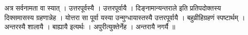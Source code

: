 अत्र सर्वनामता वा स्यात् । उत्तरपूर्वस्यै । उत्तरपूर्वायै ।
दिङ्नामान्यन्तराले इति प्रतिपदोक्तस्य दिक्समासस्य ग्रहणान्नेह । योत्तरा
सा पूर्वा यस्या उन्मुग्धायास्तस्यै उत्तरपूर्वायै । बहुव्रीहिग्रहणं
स्पष्टार्थम् । अन्तरस्यै शालायै । बाह्यायै इत्यर्थः । अपुरीत्युक्तेर्नेह
। अन्तरायै नगर्यै ॥
